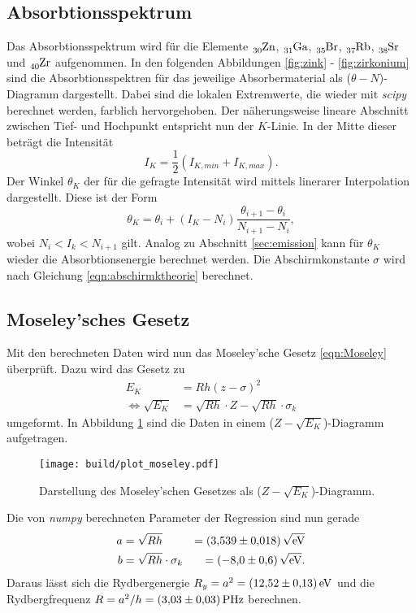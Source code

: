 \subsection{Absorbtionsspektrum}
\label{sec:absorb}
Das Absorbtionsspektrum wird für die Elemente $\ce{_{30}Zn}$, $\ce{_{31}Ga}$, $\ce{_{35}Br}$, $\ce{_{37}Rb}$, $\ce{_{38}Sr}$ und
$\ce{_{40}Zr}$ aufgenommen. In den folgenden Abbildungen \ref{fig:zink} - \ref{fig:zirkonium} sind die Absorbtionsspektren für das jeweilige
Absorbermaterial als ($\theta-N$)-Diagramm dargestellt. Dabei sind die lokalen Extremwerte, die wieder mit \textit{scipy} \cite{scipy}
berechnet werden, farblich hervorgehoben. Der näherungsweise lineare Abschnitt zwischen Tief- und Hochpunkt entspricht nun der
$K$-Linie. In der Mitte dieser beträgt die Intensität
\begin{equation*}
    I_K=\frac{1}{2}(I_{K,min}+I_{K,max})   .
\end{equation*}
Der Winkel $\theta_K$ der für die gefragte Intensität wird mittels linerarer Interpolation dargestellt. Diese ist der Form
\begin{equation*}
    \theta_K=\theta_i+(I_K-N_i)\frac{\theta_{i+1}-\theta_i}{N_{i+1}-N_i},
\end{equation*}
wobei $N_i<I_k<N_{i+1}$ gilt. Analog zu Abschnitt \ref{sec:emission} kann für $\theta_K$ wieder die Absorbtionsenergie berechnet werden.
Die Abschirmkonstante $\sigma$ wird nach Gleichung \eqref{eqn:abschirmktheorie} berechnet.



\subsection{Moseley'sches Gesetz}
\label{sec:Moseley}
Mit den berechneten Daten wird nun das Moseley'sche Gesetz \eqref{eqn:Moseley} überprüft. Dazu wird das Gesetz zu
\begin{align*}
    E_K &= R h (z - \sigma)^2 \\
    \Leftrightarrow\sqrt{E_K} &= \sqrt{R h}\cdot Z - \sqrt{R h}\cdot\sigma_k
\end{align*}
umgeformt. In Abbildung \ref{fig:moseley} sind die Daten in einem ($Z-\sqrt{E_K}$)-Diagramm aufgetragen.
\begin{figure}[H]
    \centering
    \texttt{[image: build/plot\_moseley.pdf]}
    \caption{Darstellung des Moseley'schen Gesetzes als ($Z-\sqrt{E_K}$)-Diagramm.}
    \label{fig:moseley}
\end{figure}
Die von \textit{numpy} \cite{numpy} berechneten Parameter der Regression sind nun gerade
\begin{align*}
    a&=\sqrt{R h}              &=\SI{3.539\pm 0.018}{\sqrt{\electronvolt}}\\
    b&=\sqrt{R h}\cdot\sigma_k &=\SI{-8.0 \pm 0.6}{\sqrt{\electronvolt}}.
\end{align*}
Daraus lässt sich die Rydbergenergie $R_y=a^2=\SI{12.52\pm 0.13}{\electronvolt}$ und die Rydbergfrequenz $R=a^2/h=\SI{3.03\pm 0.03}{\peta\hertz}$
berechnen.
